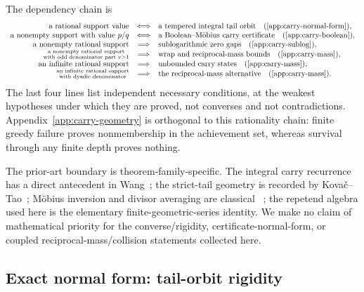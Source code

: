\documentclass[11pt]{article}
\theoremstyle{definition}
\theoremstyle{remark}
\begin{document}
The dependency chain is
{\setlength{\arraycolsep}{3.5pt}
\[
\begin{array}{rcl}
 \text{a rational support value}
 &\Longleftrightarrow& \text{a tempered integral tail orbit}
 \quad\text{(\ref{app:carry-normal-form})},\\
 \text{a nonempty support with value \(p/q\)}
 &\Longleftrightarrow& \text{a Boolean--M\"obius carry certificate}
 \quad\text{(\ref{app:carry-boolean})},\\
 \text{a nonempty rational support}
 &\Longrightarrow& \text{sublogarithmic zero gaps}\quad\text{(\ref{app:carry-sublog})},\\
 \substack{\text{a nonempty rational support}\\
 \text{with odd denominator part }v>1}
 &\Longrightarrow& \text{wrap and reciprocal-mass bounds}
 \quad\text{(\ref{app:carry-mass})},\\
 \text{an infinite rational support}
 &\Longrightarrow& \text{unbounded carry states}
 \quad\text{(\ref{app:carry-mass})},\\
 \substack{\text{an infinite rational support}\\
 \text{with dyadic denominator}}
 &\Longrightarrow& \text{the reciprocal-mass alternative}
 \quad\text{(\ref{app:carry-mass}).}
\end{array}
\]
}
The last four lines list independent necessary conditions, at the weakest
hypotheses under which they are proved, not converses and not
contradictions.  Appendix~\ref{app:carry-geometry} is orthogonal to this
rationality chain:
finite greedy failure proves nonmembership in the achievement set, whereas
survival through any finite depth proves nothing.

The prior-art boundary is theorem-family-specific. The integral carry
recurrence has a direct antecedent in
Wang~\cite[Proposition~3.1, pp.~5--6]{wang2026};
the strict-tail geometry is recorded by
Kova\v{c}--Tao~\cite[Remark~4.1, p.~13]{kovactao};
M\"obius inversion and divisor averaging are classical
~\cite[Thms.~2.2, 2.9, pp.~25, 32]{apostol}; the repetend algebra used here
is the elementary finite-geometric-series identity. We make no claim of mathematical
priority for the converse/rigidity, certificate-normal-form, or coupled
reciprocal-mass/collision statements collected here.

\subsection{Exact normal form: tail-orbit rigidity}
\label{app:carry-normal-form}
\end{document}
